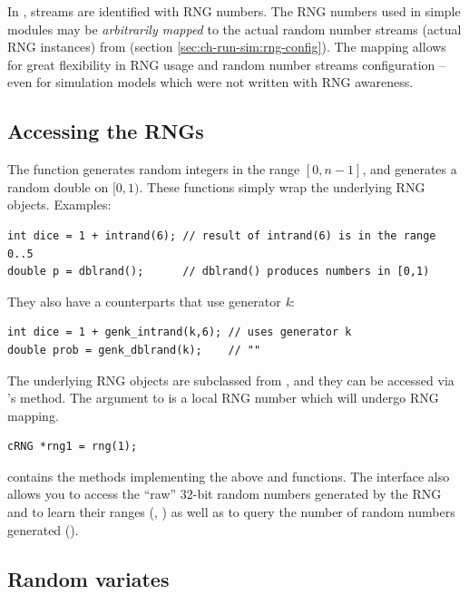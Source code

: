 In {\opp}, streams are identified with RNG numbers. The RNG numbers
used in simple modules may be \textit{arbitrarily mapped} to the actual
random number streams (actual RNG instances) from 
(section \ref{sec:ch-run-sim:rng-config}). The mapping allows
for great flexibility in RNG usage and random number streams
configuration -- even for simulation models which were not written
with RNG awareness.


\subsection{Accessing the RNGs}

The  function generates random integers in the range $[0, n-1]$, and
 generates a random double on $[0,1)$. These functions
simply wrap the underlying RNG objects. Examples:

\begin{verbatim}
int dice = 1 + intrand(6); // result of intrand(6) is in the range 0..5
double p = dblrand();      // dblrand() produces numbers in [0,1)
\end{verbatim}

They also have a counterparts that use generator \textit{k}:

\begin{verbatim}
int dice = 1 + genk_intrand(k,6); // uses generator k
double prob = genk_dblrand(k);    // ""
\end{verbatim}

The underlying RNG objects are subclassed from ,
and they can be accessed via 's  method.
The argument to  is a local RNG number which will undergo
RNG mapping.

\begin{verbatim}
cRNG *rng1 = rng(1);
\end{verbatim}

 contains the methods implementing the above 
and  functions. The  interface also allows
you to access the ``raw'' 32-bit random numbers generated by the RNG
and to learn their ranges (, ) as well as
to query the number of random numbers generated ().


\subsection{Random variates}

